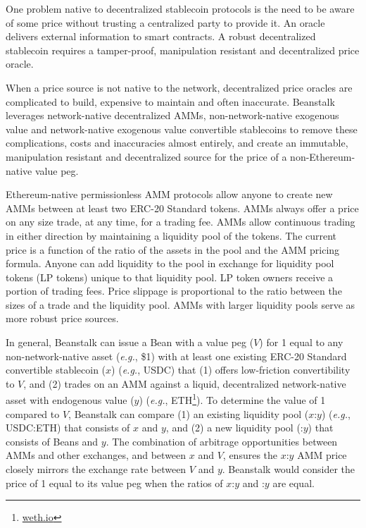 \documentclass[tikz]{article}
\newcommand{\term}[1]{\textsl{#1}}
\newcommand{\fref}[1]{\footnote{\href{http://#1}{#1}}}
\newcommand{\Bean}{} %
\begin{document}
One problem native to decentralized stablecoin protocols is the need to be aware of some price without trusting a centralized party to provide it. An oracle delivers external information to smart contracts. A robust decentralized stablecoin requires a tamper-proof, manipulation resistant and decentralized price oracle.

When a price source is not native to the network, decentralized price oracles are complicated to build, expensive to maintain and often inaccurate. Beanstalk leverages network-native decentralized AMMs, non-network-native exogenous value and network-native exogenous value convertible stablecoins to remove these complications, costs and inaccuracies almost entirely, and create an immutable, manipulation resistant and decentralized source for the price of a non-Ethereum-native value peg.

Ethereum-native permissionless AMM protocols allow anyone to create new AMMs between at least two ERC-20 Standard tokens. AMMs always offer a price on any size trade, at any time, for a trading fee. AMMs allow continuous trading in either direction by maintaining a liquidity pool of the tokens. The current price is a function of the ratio of the assets in the pool and the AMM pricing formula. Anyone can add liquidity to the pool in exchange for liquidity pool tokens (LP tokens) unique to that liquidity pool. LP token owners receive a portion of trading fees. Price slippage is proportional to the ratio between the sizes of a trade and the liquidity pool. AMMs with larger liquidity pools serve as more robust price sources.

In general, Beanstalk can issue a Bean with a value peg ($V$) for \Bean1 equal to any non-network-native asset (\term{e.g.}, \$1) with at least one existing ERC-20 Standard convertible stablecoin ($x$) (\term{e.g.}, USDC) that (1) offers low-friction convertibility to $V$, and (2) trades on an AMM against a liquid, decentralized network-native asset with endogenous value ($y$) (\term{e.g.}, ETH\fref{weth.io}). To determine the value of \Bean1 compared to $V$, Beanstalk can compare (1) an existing liquidity pool ($x$:$y$) (\term{e.g.}, USDC:ETH) that consists of $x$ and $y$, and (2) a new liquidity pool (\Bean:$y$) that consists of Beans and $y$. The combination of arbitrage opportunities between AMMs and other exchanges, and between $x$ and $V$, ensures the $x$:$y$ AMM price closely mirrors the exchange rate between $V$ and $y$. Beanstalk would consider the price of \Bean1 equal to its value peg when the ratios of $x$:$y$ and \Bean:$y$ are equal.
\end{document}

